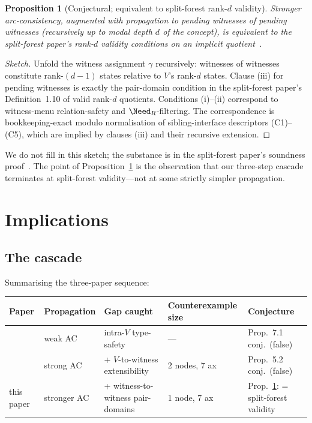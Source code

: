 \documentclass[11pt]{article}
\newtheorem{proposition}[theorem]{Proposition}
\theoremstyle{definition}
\theoremstyle{remark}
\begin{document}
\begin{proposition}[Conjectural; equivalent to split-forest rank-$d$
validity]
\label{prop:converge}
Stronger arc-consistency, augmented with propagation to pending
witnesses of \emph{pending witnesses} (recursively up to modal
depth $d$ of the concept), is equivalent to the split-forest
paper's rank-$d$ validity conditions on an implicit
quotient~\cite{SplitForest}.
\end{proposition}

\begin{proof}[Sketch]
Unfold the witness assignment $\gamma$ recursively: witnesses of
witnesses constitute rank-$(d-1)$ states relative to $V$'s rank-$d$
states.  Clause (iii) for pending witnesses is exactly the
pair-domain condition in the split-forest paper's Definition~1.10
of valid rank-$d$ quotients.  Conditions (i)--(ii) correspond to
witness-menu relation-safety and $\Need_R$-filtering.
The correspondence is bookkeeping-exact modulo
normalisation of sibling-interface descriptors (C1)--(C5), which
are implied by clauses (iii) and their recursive extension.
\end{proof}

We do not fill in this sketch; the substance is in the split-forest
paper's soundness proof~\cite{SplitForest}.  The point of
Proposition~\ref{prop:converge} is the observation that our
three-step cascade terminates at split-forest validity---not at
some strictly simpler propagation.

\section{Implications}
\label{sec:impl}

\subsection{The cascade}

Summarising the three-paper sequence:
\begin{center}
\begin{tabular}{@{}lllll@{}}
  \toprule
  Paper & Propagation & Gap caught & Counterexample size & Conjecture \\
  \midrule
  \cite{PatchworkProbe} & weak AC & intra-$V$ type-safety & ---
    & Prop.~7.1 conj.\ (false) \\
  \cite{CounterEx2} & strong AC & + $V$-to-witness extensibility & 2 nodes, 7 ax
    & Prop.~5.2 conj.\ (false) \\
  this paper & stronger AC & + witness-to-witness pair-domains & 1 node, 7 ax
    & Prop.~\ref{prop:converge}: = split-forest validity \\
  \bottomrule
\end{tabular}
\end{center}
\end{document}
